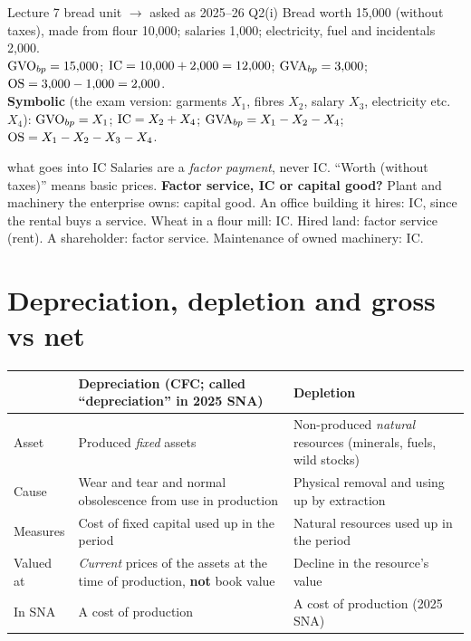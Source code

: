 \begin{tmpl}{Lecture 7 bread unit $\to$ asked as 2025--26 Q2(i)}
\small Bread worth 15,000 (without taxes), made from flour 10,000; salaries 1,000; electricity,
fuel and incidentals 2,000.\\
$\mathrm{GVO}_{bp}=15{,}000$; $\mathrm{IC}=10{,}000+2{,}000=12{,}000$; $\mathrm{GVA}_{bp}=3{,}000$;
$\mathrm{OS}=3{,}000-1{,}000=2{,}000$.\\
\textbf{Symbolic} (the exam version: garments $X_1$, fibres $X_2$, salary $X_3$, electricity
etc.\ $X_4$): $\mathrm{GVO}_{bp}=X_1$; $\mathrm{IC}=X_2+X_4$; $\mathrm{GVA}_{bp}=X_1-X_2-X_4$;
$\mathrm{OS}=X_1-X_2-X_3-X_4$.
\end{tmpl}

\begin{trap}{what goes into IC}
\small Salaries are a \emph{factor payment}, never IC. ``Worth (without taxes)'' means basic
prices. \textbf{Factor service, IC or capital good?} Plant and machinery the enterprise owns:
capital good. An office building it hires: IC, since the rental buys a service. Wheat in a flour
mill: IC. Hired land: factor service (rent). A shareholder: factor service. Maintenance of owned
machinery: IC.
\end{trap}

\section{Depreciation, depletion and gross vs net}\label{sec:dd}

\begin{center}\small
\begin{tabularx}{\textwidth}{@{}l X X@{}}
\toprule
& \textbf{Depreciation} (CFC; called ``depreciation'' in 2025 SNA) & \textbf{Depletion} \\
\midrule
Asset & Produced \emph{fixed} assets & Non-produced \emph{natural} resources (minerals, fuels, wild
stocks) \\
Cause & Wear and tear and normal obsolescence from use in production & Physical removal and
using up by extraction \\
Measures & Cost of fixed capital used up in the period & Natural resources used up in the
period \\
Valued at & \emph{Current} prices of the assets at the time of production, \textbf{not} book
value & Decline in the resource's value \\
In SNA & A cost of production & A cost of production (2025 SNA) \\
\bottomrule
\end{tabularx}
\end{center}

